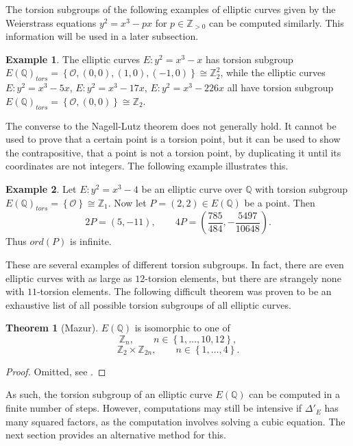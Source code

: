 \documentclass{article}
\newcommand{\Z}{\mathbb{Z}}
\newcommand{\Q}{\mathbb{Q}}
\newcommand{\rb}[1]{\left( #1 \right)}
\newcommand{\cb}[1]{\left\{ #1 \right\}}
\theoremstyle{definition}\newtheorem*{definition}{Definition}
\theoremstyle{definition}\newtheorem*{example}{Example}
\theoremstyle{definition}\newtheorem*{remark}{Remark}
\newtheorem{theorem}[proposition]{Theorem}
\begin{document}
The torsion subgroups of the following examples of elliptic curves given by the Weierstrass equations $ y^2 = x^3 - px $ for $ p \in \Z_{> 0} $ can be computed similarly. This information will be used in a later subsection.

\begin{example}
The elliptic curves $ E : y^2 = x^3 - x $ has torsion subgroup $ E\rb{\Q}_{tors} = \cb{\mathcal{O}, \rb{0, 0}, \rb{1, 0}, \rb{-1, 0}} \cong \Z_2^2 $, while the elliptic curves $ E : y^2 = x^3 - 5x $, $ E : y^2 = x^3 - 17x $, $ E : y^2 = x^3 - 226x $ all have torsion subgroup $ E\rb{\Q}_{tors} = \cb{\mathcal{O}, \rb{0, 0}} \cong \Z_2 $.
\end{example}

The converse to the Nagell-Lutz theorem does not generally hold. It cannot be used to prove that a certain point is a torsion point, but it can be used to show the contrapositive, that a point is not a torsion point, by duplicating it until its coordinates are not integers. The following example illustrates this.

\begin{example}
Let $ E : y^2 = x^3 - 4 $ be an elliptic curve over $ \Q $ with torsion subgroup $ E\rb{\Q}_{tors} = \cb{\mathcal{O}} \cong \Z_1 $. Now let $ P = \rb{2, 2} \in E\rb{\Q} $ be a point. Then
$$ 2P = \rb{5, -11}, \qquad 4P = \rb{\dfrac{785}{484}, -\dfrac{5497}{10648}}. $$
Thus $ ord\rb{P} $ is infinite.
\end{example}

These are several examples of different torsion subgroups. In fact, there are even elliptic curves with as large as $ 12 $-torsion elements, but there are strangely none with $ 11 $-torsion elements. The following difficult theorem was proven to be an exhaustive list of all possible torsion subgroups of all elliptic curves.

\begin{theorem}[Mazur]
$ E\rb{\Q} $ is isomorphic to one of
$$ \Z_n, \qquad n \in \cb{1, \dots, 10, 12}, $$
$$ \Z_2 \times \Z_{2n}, \qquad n \in \cb{1, \dots, 4}. $$
\end{theorem}

\begin{proof}
Omitted, see \cite{mazur}.
\end{proof}

As such, the torsion subgroup of an elliptic curve $ E\rb{\Q} $ can be computed in a finite number of steps. However, computations may still be intensive if $ \Delta'_E $ has many squared factors, as the computation involves solving a cubic equation. The next section provides an alternative method for this.
\end{document}
